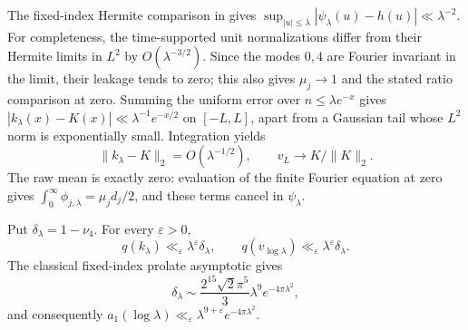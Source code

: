 The fixed-index Hermite comparison in
\cite[Lemma~7.2, p.~29]{ccm2025} gives
$\sup_{|u|\le\lambda}|\psi_\lambda(u)-h(u)|\ll\lambda^{-2}$.
For completeness, the time-supported unit normalizations differ from
their Hermite limits in $L^2$ by $O(\lambda^{-3/2})$. Since the modes
$0,4$ are Fourier invariant in the limit, their leakage tends to zero;
this also gives $\mu_j\to1$ and the stated ratio comparison at zero.
Summing the uniform error over $n\le\lambda e^{-x}$ gives
$|k_\lambda(x)-K(x)|\ll\lambda^{-1}e^{-x/2}$ on $[-L,L]$, apart
from a Gaussian tail whose $L^2$ norm is exponentially small.
Integration yields
\begin{equation}
 \|k_\lambda-K\|_2=O(\lambda^{-1/2}),\qquad
 v_L\longrightarrow K/\|K\|_2.
 \label{eq:prolate-trial-limit}
\end{equation}
The raw mean is exactly zero: evaluation of the finite Fourier equation
at zero gives $\int_0^\infty\phi_{j,\lambda}=\mu_jd_j/2$, and these
terms cancel in $\psi_\lambda$.

\begin{proposition}
\label{prop:prolate-upper}
Put $\delta_\lambda=1-\nu_4$. For every $\varepsilon>0$,
\[
 q(k_\lambda)\ll_\varepsilon\lambda^\varepsilon\delta_\lambda,
 \qquad q(v_{\log\lambda})
                  \ll_\varepsilon\lambda^\varepsilon\delta_\lambda.
\]
The classical fixed-index prolate asymptotic gives
\[
 \delta_\lambda\sim
  \frac{2^{15}\sqrt2\pi^5}{3}\lambda^9e^{-4\pi\lambda^2},
\]
and consequently
$a_1(\log\lambda)\ll_\varepsilon
\lambda^{9+\varepsilon}e^{-4\pi\lambda^2}$.
\end{proposition}

